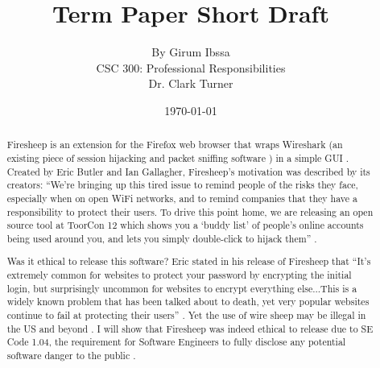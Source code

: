 \documentclass[11pt]{article}
\begin{document}
\title{\vfill Term Paper Short Draft} %
\author{
By Girum Ibssa\vspace{10pt} \\
CSC 300: Professional Responsibilities\vspace{10pt} \\
Dr. Clark Turner\vspace{10pt} \\
}
\date{\today}

\maketitle

\vfill  %
\begin{abstract}
Firesheep is an extension for the Firefox web browser that wraps Wireshark (an existing piece of session hijacking and packet sniffing software \cite{wireshark}) in a simple GUI \cite{firesheep-source}. Created by Eric Butler and Ian Gallagher, Firesheep's motivation was described by its creators: ``We're bringing up this tired issue to remind people of the risks they face, especially when on open WiFi networks, and to remind companies that they have a responsibility to protect their users. To drive this point home, we are releasing an open source tool at ToorCon 12 which shows you a `buddy list' of people's online accounts being used around you, and lets you simply double-click to hijack them'' \cite{security-now}.

Was it ethical to release this software? Eric stated in his release of Firesheep that ``It's extremely common for websites to protect your password by encrypting the initial login, but surprisingly uncommon for websites to encrypt everything else...This is a widely known problem that has been talked about to death, yet very popular websites continue to fail at protecting their users'' \cite{eric-butler}. Yet the use of wire sheep may be illegal in the US and beyond \cite{illegal-to-use-firesheep}. I will show that Firesheep was indeed ethical to release due to SE Code 1.04, the requirement for Software Engineers to fully disclose any potential software danger to the public \cite{se-code}.

\end{abstract}
\end{document}
